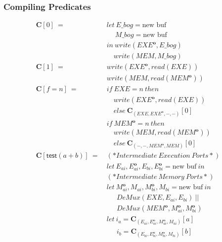 \documentclass[12pt, letterpaper]{article}
\newcommand\obf[1]{#1^\mathbf{o}}
\begin{document}
      \subsubsection{Compiling Predicates}\label{sec:compile:compile:pred}
          {\centering
          \begin{align*}
            \mathbf{C}[0]\ 
              =\ &
              let\    E\_bog = \text{new buf}\\
              &\quad\ M\_bog = \text{new buf}\\
              &in\ write(\obf{EXE}, E\_bog)\\
              &\quad  write(MEM, M\_bog)\\
            \mathbf{C}[1]\ 
              =\ &
              write(\obf{EXE}, read(EXE))\\
              &write(MEM, read(\obf{MEM}))
              \\
            \mathbf{C}[f = n]\
              =\
              &if\ EXE=n\ then\\
              &\quad write(\obf{EXE}, read(EXE))\\
              &\quad else\ \mathbf{C}_{(EXE, \obf{EXE}, -, -)}[0]\\
              &if\ \obf{MEM}=n\ then\\
              &\quad write(MEM, read(\obf{MEM}))\\
              &\quad else\ \mathbf{C}_{(-, -, \obf{MEM}, MEM)}[0]\\
            \mathbf{C}[\mathsf{test}(a + b)]\ 
              =\
              & (*Intermediate\ Execution\ Ports*)\\
              & let\ E_{ai}, \obf{E}_{ai}, E_{bi}, \obf{E}_{bi} = \text{new buf}\ in\\
              & (*Intermediate\ Memory\ Ports*)\\
              & let\ \obf{M}_{ai}, M_{ai}, \obf{M}_{bi}, M_{bi} = \text{new buf}\ in\\
              &\quad\ \ DeMux(EXE, E_{ai}, E_{bi})\ ||\\
              &\quad\ \ DeMux(\obf{MEM}, \obf{M}_{ai}, \obf{M}_{bi})\\
              &let\     i_a = \mathbf{C}_{(E_{ai},\obf{E}_{ai},\obf{M}_{ai},M_{ai})}[a]\\
              &\quad\ \ i_b = \mathbf{C}_{(E_{bi},\obf{E}_{bi},\obf{M}_{bi},M_{bi})}[b]\\

\end{align*}}
\end{document}
